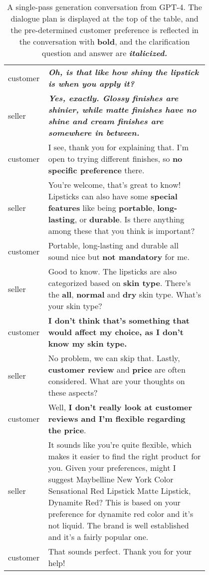 \begin{table*}[t]
\begin{center}
\begin{tabular}{l p{0.8\linewidth} }
    customer& \textbf{\textit{Oh, is that like how shiny the lipstick is when you apply it?}}\\\hdashline
    seller& \textbf{\textit{Yes, exactly. Glossy finishes are shinier, while matte finishes have no shine and cream finishes are somewhere in between.}}\\ \hdashline
    customer& I see, thank you for explaining that. I'm open to trying different finishes, so \textbf{no specific preference} there. \\\hdashline
    seller& You're welcome, that's great to know! Lipsticks can also have some \textbf{special features} like being \textbf{portable}, \textbf{long-lasting}, or \textbf{durable}. Is there anything among these that you think is important?\\ \hdashline
    customer& Portable, long-lasting and durable all sound nice but \textbf{not mandatory} for me. \\\hdashline
    seller& Good to know. The lipsticks are also categorized based on \textbf{skin type}. There's the \textbf{all}, \textbf{normal} and \textbf{dry} skin type. What's your skin type?\\ \hdashline
    customer& \textbf{I don't think that's something that would affect my choice, as I don't know my skin type.} \\\hdashline
    seller& No problem, we can skip that. Lastly, \textbf{customer review} and \textbf{price} are often considered. What are your thoughts on these aspects?\\ \hdashline
    customer& Well, \textbf{I don't really look at customer reviews and I'm flexible regarding the price}. \\\hdashline
    seller& It sounds like you're quite flexible, which makes it easier to find the right product for you. Given your preferences, might I suggest Maybelline New York Color Sensational Red Lipstick Matte Lipstick, Dynamite Red? This is based on your preference for dynamite red color and it's not liquid. The brand is well established and it's a fairly popular one. \\ \hdashline
    customer& That sounds perfect. Thank you for your help! \\
    \hline
    \end{tabular}
    \caption{A single-pass generation conversation from GPT-4. The dialogue plan is displayed at the top of the table, and the pre-determined customer preference is reflected in the conversation with \textbf{bold}, and the clarification question and answer are \textbf{\textit{italicized.}}} \label{tab:good_example}
\end{center}
\end{table*}


